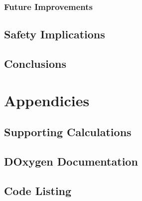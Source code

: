 \documentclass[10pt,a4paper]{report}
\begin{document}
\section{Future Improvements}

\chapter{Safety Implications}

\chapter{Conclusions}

\part{Appendicies}

\chapter{Supporting Calculations}

\chapter{DOxygen Documentation}

\chapter{Code Listing}
\end{document}

